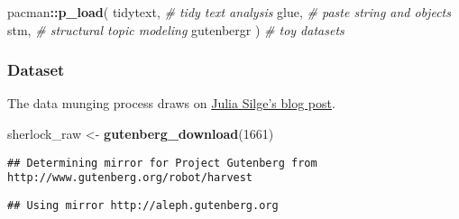\documentclass[
]{book}
\newenvironment{Shaded}{\begin{snugshade}}{\end{snugshade}}
\newcommand{\CommentTok}[1]{\textcolor[rgb]{0.56,0.35,0.01}{\textit{#1}}}
\newcommand{\DecValTok}[1]{\textcolor[rgb]{0.00,0.00,0.81}{#1}}
\newcommand{\KeywordTok}[1]{\textcolor[rgb]{0.13,0.29,0.53}{\textbf{#1}}}
\newcommand{\NormalTok}[1]{#1}
\newcommand{\OperatorTok}[1]{\textcolor[rgb]{0.81,0.36,0.00}{\textbf{#1}}}
\newcommand{\StringTok}[1]{\textcolor[rgb]{0.31,0.60,0.02}{#1}}
\begin{document}
\begin{Shaded}
\begin{Highlighting}[]
\NormalTok{pacman}\OperatorTok{::}\KeywordTok{p\_load}\NormalTok{(}
\NormalTok{  tidytext, }\CommentTok{\# tidy text analysis}
\NormalTok{  glue, }\CommentTok{\# paste string and objects}
\NormalTok{  stm, }\CommentTok{\# structural topic modeling}
\NormalTok{  gutenbergr}
\NormalTok{) }\CommentTok{\# toy datasets}
\end{Highlighting}
\end{Shaded}

\hypertarget{dataset-1}{%
\subsubsection{Dataset}\label{dataset-1}}

The data munging process draws on \href{https://juliasilge.com/blog/sherlock-holmes-stm/}{Julia Silge's blog post}.

\begin{Shaded}
\begin{Highlighting}[]
\NormalTok{sherlock\_raw \textless{}{-}}\StringTok{ }\KeywordTok{gutenberg\_download}\NormalTok{(}\DecValTok{1661}\NormalTok{)}
\end{Highlighting}
\end{Shaded}

\begin{verbatim}
## Determining mirror for Project Gutenberg from http://www.gutenberg.org/robot/harvest
\end{verbatim}

\begin{verbatim}
## Using mirror http://aleph.gutenberg.org
\end{verbatim}
\end{document}
